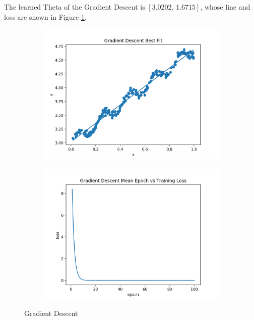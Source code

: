 \documentclass[11pt]{article}
\begin{document}
\begin{enumerate}
The learned Theta of the Gradient Descent is $[3.0202,\, 1.6715]$, whose line and loss are shown in Figure \ref{fig:gd}.

\begin{figure}[!h]
    \centering
    \begin{subfigure}[b]{0.4\linewidth}
      \includegraphics[width=\linewidth]{figures/gd.png}
    \end{subfigure}
    \begin{subfigure}[b]{0.4\linewidth}
      \includegraphics[width=\linewidth]{figures/gd_loss.png}
    \end{subfigure}
    \caption{Gradient Descent}
    \label{fig:gd}
\end{figure}


\end{enumerate}
\end{document}
